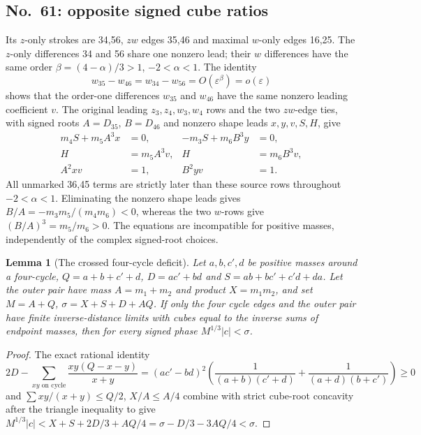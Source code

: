 \documentclass[11pt]{amsart}
\newtheorem{lemma}[theorem]{Lemma}
\theoremstyle{remark}
\begin{document}
\subsection{No.~61: opposite signed cube ratios}\label{sec:no61-sign}
Its $z$-only strokes are 34,56, $zw$ edges 35,46 and maximal $w$-only edges 16,25. The $z$-only differences 34 and 56 share one nonzero lead; their $w$ differences have the same order $\beta=(4-\alpha)/3>1$, $-2<\alpha<1$. The identity
\[
w_{35}-w_{46}=w_{34}-w_{56}=O(\varepsilon^\beta)=o(\varepsilon)
\]
shows that the order-one differences $w_{35}$ and $w_{46}$ have the same nonzero leading coefficient $v$. The original leading $z_3,z_4,w_3,w_4$ rows and the two $zw$-edge ties, with signed roots $A=D_{35}$, $B=D_{46}$ and nonzero shape leads $x,y,v,S,H$, give
\begin{equation}\label{eq:no61-source-rows}
\begin{aligned}
m_4S+m_5A^3x&=0,&-m_3S+m_6B^3y&=0,\\
H&=m_5A^3v,&H&=m_6B^3v,\\
A^2xv&=1,&B^2yv&=1.
\end{aligned}
\end{equation}
All unmarked 36,45 terms are strictly later than these source rows throughout $-2<\alpha<1$. Eliminating the nonzero shape leads gives $B/A=-m_3m_5/(m_4m_6)<0$, whereas the two $w$-rows give $(B/A)^3=m_5/m_6>0$. The equations are incompatible for positive masses, independently of the complex signed-root choices.

\begin{lemma}[The crossed four-cycle deficit]\label{lem:excluded-cycle}
Let $a,b,c',d$ be positive masses around a four-cycle, $Q=a+b+c'+d$, $D=ac'+bd$ and $S=ab+bc'+c'd+da$. Let the outer pair have mass $A=m_1+m_2$ and product $X=m_1m_2$, and set $M=A+Q$, $\sigma=X+S+D+AQ$. If only the four cycle edges and the outer pair have finite inverse-distance limits with cubes equal to the inverse sums of endpoint masses, then for every signed phase $M^{1/3}|c|<\sigma$.
\end{lemma}

\begin{proof}
The exact rational identity
\begin{equation}\label{eq:four-cycle-deficit}
2D-\sum_{xy\text{ on cycle}}\frac{xy(Q-x-y)}{x+y}=(ac'-bd)^2\left(\frac1{(a+b)(c'+d)}+\frac1{(a+d)(b+c')}\right)\ge0
\end{equation}
and $\sum xy/(x+y)\le Q/2$, $X/A\le A/4$ combine with strict cube-root concavity after the triangle inequality to give $M^{1/3}|c|<X+S+2D/3+AQ/4=\sigma-D/3-3AQ/4<\sigma$.
\end{proof}
\end{document}
